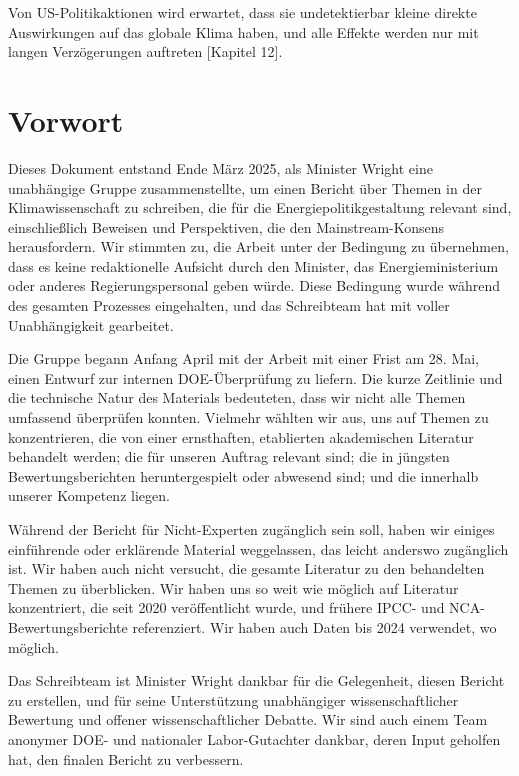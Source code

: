 \documentclass[12pt,paper=a4,DIV=12,parskip=never,chapterprefix=false,headings=standardclasses]{scrreprt}
\numberwithin{figure}{chapter}
\begin{document}
Von US-Politikaktionen wird erwartet, dass sie undetektierbar kleine direkte Auswirkungen auf das globale Klima haben, und alle Effekte werden nur mit langen Verzögerungen auftreten [Kapitel 12].

\cleardoublepage
\chapter*{Vorwort}
Dieses Dokument entstand Ende März 2025, als Minister Wright eine unabhängige Gruppe zusammenstellte, um einen Bericht über Themen in der Klimawissenschaft zu schreiben, die für die Energiepolitikgestaltung relevant sind, einschließlich Beweisen und Perspektiven, die den Mainstream-Konsens herausfordern. Wir stimmten zu, die Arbeit unter der Bedingung zu übernehmen, dass es keine redaktionelle Aufsicht durch den Minister, das Energieministerium oder anderes Regierungspersonal geben würde. Diese Bedingung wurde während des gesamten Prozesses eingehalten, und das Schreibteam hat mit voller Unabhängigkeit gearbeitet.

Die Gruppe begann Anfang April mit der Arbeit mit einer Frist am 28. Mai, einen Entwurf zur internen DOE-Überprüfung zu liefern. Die kurze Zeitlinie und die technische Natur des Materials bedeuteten, dass wir nicht alle Themen umfassend überprüfen konnten. Vielmehr wählten wir aus, uns auf Themen zu konzentrieren, die von einer ernsthaften, etablierten akademischen Literatur behandelt werden; die für unseren Auftrag relevant sind; die in jüngsten Bewertungsberichten heruntergespielt oder abwesend sind; und die innerhalb unserer Kompetenz liegen.

Während der Bericht für Nicht-Experten zugänglich sein soll, haben wir einiges einführende oder erklärende Material weggelassen, das leicht anderswo zugänglich ist. Wir haben auch nicht versucht, die gesamte Literatur zu den behandelten Themen zu überblicken. Wir haben uns so weit wie möglich auf Literatur konzentriert, die seit 2020 veröffentlicht wurde, und frühere IPCC- und NCA-Bewertungsberichte referenziert. Wir haben auch Daten bis 2024 verwendet, wo möglich.

Das Schreibteam ist Minister Wright dankbar für die Gelegenheit, diesen Bericht zu erstellen, und für seine Unterstützung unabhängiger wissenschaftlicher Bewertung und offener wissenschaftlicher Debatte. Wir sind auch einem Team anonymer DOE- und nationaler Labor-Gutachter dankbar, deren Input geholfen hat, den finalen Bericht zu verbessern.
\vspace{2ex}
\end{document}
